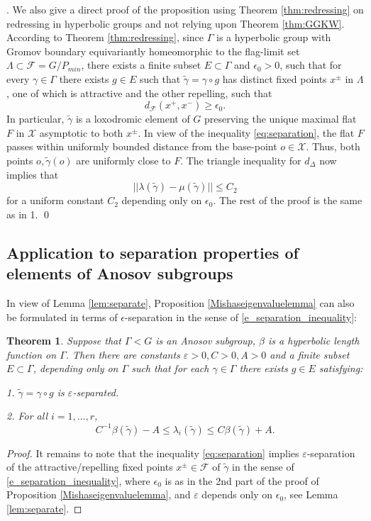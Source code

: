 \documentclass[12pt]{amsbook}%
\newtheorem{thm}{Theorem}[chapter]
\theoremstyle{definition}
\theoremstyle{remark}
\numberwithin{section}{chapter}
\numberwithin{subsection}{section}
\numberwithin{figure}{chapter}
\def\eps{\epsilon}
\def\cF{{\mathscr{F}}}
\def\cX{{\mathscr{X}}}
\def\Ga{\Gamma}
\def\ga{\gamma}
\def\La{\Lambda}
\def\la{\lambda}
\def\kap{}
\begin{document}
{{. We also give a direct proof of the proposition using Theorem \ref{thm:redressing} on redressing in hyperbolic groups and not relying upon Theorem \ref{thm:GGKW}. According to Theorem \ref{thm:redressing}, since $\Ga$ is a hyperbolic group with Gromov boundary equivariantly homeomorphic to the flag-limit set $\La\subset {\mathcal F}=G/P_{min}$, there exists a finite subset $E\subset \Ga$ and $\eps_0>0$, such that for every $\gamma\in \Gamma$  there exists $g\in E$ such that $\tilde\gamma = \gamma\circ g$ has 
distinct fixed points $x^\pm$ in $\La$, one of which is attractive and the other repelling, such that 
\begin{equation}\label{eq:separation} 
d_{\cF}(x^+, x^-)\geqslant \eps_0.\end{equation}
 In particular, $\tilde\gamma$ is a loxodromic element of $G$ preserving the unique maximal flat $F$ in $\cX$ asymptotic to both $x^\pm$. In view of the inequality \eqref{eq:separation},  the flat $F$ passes within uniformly bounded distance from the base-point $o\in \cX$.  Thus, both points $o, \tilde\gamma(o)$ are uniformly close to $F$. The triangle inequality for $d_\Delta$ now implies that 
$$
||\la(\tilde\ga)- \mu(\tilde\ga)||\leqslant C_2
$$ 
for a uniform constant $C_2$ depending only on $\epsilon_0$. The rest of the proof is the same as in 1. \qed 


\subsection{Application to separation properties of elements of Anosov subgroups} 

In view of Lemma \ref{lem:separate}, Proposition \ref{Mishaseigenvaluelemma} can also be formulated in terms of $\eps$-separation in the sense of 
 \eqref{e_separation_inequality}:

\begin{thm}\label{Mishaseigenvaluelemma1}
Suppose that $\Gamma< G$ is an Anosov subgroup, $\beta$ is a hyperbolic length function on $\Ga$. 
Then there are constants $\varepsilon>0, C>0, A>0$ and a finite subset $E\subset \Gamma$, depending only on $\Gamma$ such that for each $\gamma\in \Gamma$ there exists $g\in E$ satisfying:

1.  $\tilde \gamma= \ga\circ g$ is $\varepsilon$-separated.

2. For all $i=1,...,r$, %
$$
C^{-1} \beta(\tilde\gamma)- A \leqslant \la_i(\tilde\gamma)\leqslant C \beta(\tilde\gamma)+ A.  
$$
\end{thm}
\begin{proof} It remains to note that the inequality \eqref{eq:separation} implies $\varepsilon$-separation of the attractive/repelling 
fixed points $x^\pm\in \cF$ of $\tilde\ga$ 
in the sense of \eqref{e_separation_inequality}, where $\eps_0$ is as in the 2nd part of the proof of Proposition \ref{Mishaseigenvaluelemma}, 
and $\varepsilon$ depends only on $\eps_0$, see Lemma \ref{lem:separate}. \end{proof} 

}}
\end{document}
